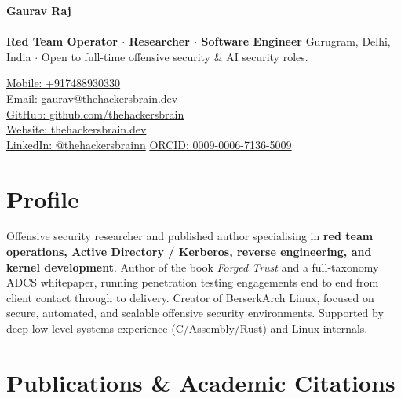 \documentclass[10pt]{article}
\begin{document}
\begin{center}
	\begin{minipage}{0.65\textwidth}
		{\Huge\bfseries Gaurav Raj} \\
		\\
		\textbf{Red Team Operator $\cdot$ Researcher $\cdot$ Software Engineer} \newline
		Gurugram, Delhi, India $\cdot$ Open to full-time offensive security \& AI security roles.
	\end{minipage} \hfill
	\begin{minipage}{0.30\textwidth}
		\raggedleft
		\href{tel:+917488930330}{Mobile: +917488930330} \\
		\href{mailto:gaurav@thehackersbrain.dev}{Email: gaurav@thehackersbrain.dev} \\
		\href{https://github.com/thehackersbrain}{GitHub: github.com/thehackersbrain} \\
		\href{https://thehackersbrain.dev/}{Website: thehackersbrain.dev} \\
		\href{https://www.linkedin.com/in/thehackersbrainn}{LinkedIn: @thehackersbrainn}
		\href{https://orcid.org/0009-0006-7136-5009}{ORCID: 0009-0006-7136-5009}
	\end{minipage}
\end{center}

\vspace{3pt}

\section{Profile}

\noindent Offensive security researcher and published author specialising in \textbf{red team operations, Active Directory / Kerberos, reverse engineering, and kernel development}. Author of the book \textit{Forged Trust} and a full-taxonomy ADCS whitepaper, running penetration testing engagements end to end from client contact through to delivery. Creator of BerserkArch Linux, focused on secure, automated, and scalable offensive security environments. Supported by deep low-level systems experience (C/Assembly/Rust) and Linux internals.

\section{Publications \& Academic Citations}
\end{document}
